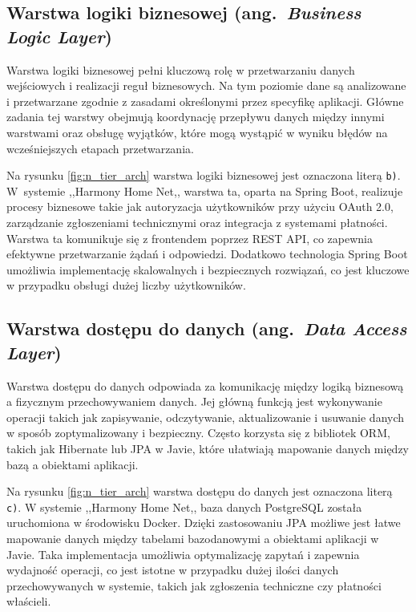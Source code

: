 \subsection{Warstwa logiki biznesowej (ang.\ \emph{Business Logic Layer})}

Warstwa logiki biznesowej pełni kluczową rolę w przetwarzaniu danych wejściowych i realizacji reguł biznesowych. Na tym poziomie dane są analizowane i przetwarzane zgodnie z zasadami określonymi przez specyfikę aplikacji. Główne zadania tej warstwy obejmują koordynację przepływu danych między innymi warstwami oraz obsługę wyjątków, które mogą wystąpić w wyniku błędów na wcześniejszych etapach przetwarzania.

Na rysunku \ref{fig:n_tier_arch} warstwa logiki biznesowej jest oznaczona  literą \texttt{b)}. W~systemie ,,Harmony Home Net,, warstwa ta, oparta na Spring Boot, realizuje procesy biznesowe takie jak autoryzacja użytkowników przy użyciu OAuth 2.0, zarządzanie zgłoszeniami technicznymi oraz integracja z systemami płatności. Warstwa ta komunikuje się z frontendem poprzez REST API, co zapewnia efektywne przetwarzanie żądań i odpowiedzi. Dodatkowo technologia Spring Boot umożliwia implementację skalowalnych i bezpiecznych rozwiązań, co jest kluczowe w przypadku obsługi dużej liczby użytkowników.

\subsection{Warstwa dostępu do danych (ang.\ \emph{Data Access Layer})}

Warstwa dostępu do danych odpowiada za komunikację między logiką biznesową a fizycznym przechowywaniem danych. Jej główną funkcją jest wykonywanie operacji takich jak zapisywanie, odczytywanie, aktualizowanie i usuwanie danych w sposób zoptymalizowany i bezpieczny. Często korzysta się z bibliotek ORM, takich jak Hibernate lub JPA w Javie, które ułatwiają mapowanie danych między bazą a obiektami aplikacji.

Na rysunku \ref{fig:n_tier_arch} warstwa dostępu do danych jest oznaczona literą \texttt{c)}. W systemie ,,Harmony Home Net,, baza danych PostgreSQL została uruchomiona w środowisku Docker. Dzięki zastosowaniu JPA możliwe jest łatwe mapowanie danych między tabelami bazodanowymi a obiektami aplikacji w Javie. Taka implementacja umożliwia optymalizację zapytań i zapewnia wydajność operacji, co jest istotne w przypadku dużej ilości danych przechowywanych w systemie, takich jak zgłoszenia techniczne czy płatności właścieli.

